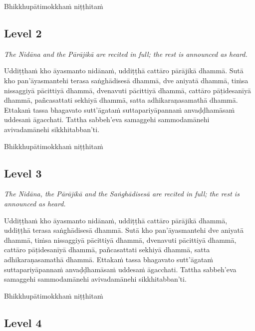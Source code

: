 \begin{outro}
	Bhikkhupātimokkhaṁ niṭṭhitaṁ
\end{outro}

{}
\subsection*{Level 2}
\label{in-brief-level2}

\textit{The Nidāna and the Pārājikā are recited in full; the rest is announced as heard.}

\smallskip

Uddiṭṭhaṁ kho āyasmanto nidānaṁ, uddiṭṭhā cattāro pārājikā dhammā. Sutā kho pan'āyasmantehi terasa saṅghādisesā dhammā, dve aniyatā dhammā, tiṁsa nissaggiyā pācittiyā dhammā, dvenavuti pācittiyā dhammā, cattāro pāṭidesanīyā dhammā, pañcasattati sekhiyā dhammā, satta adhikaraṇasamathā dhammā. Ettakaṁ tassa bhagavato sutt'āgataṁ suttapariyāpannaṁ anvaḍḍhamāsaṁ uddesaṁ āgacchati. Tattha sabbeh'eva samaggehi sammodamānehi avivadamānehi sikkhitabban'ti.

\begin{outro}
	Bhikkhupātimokkhaṁ niṭṭhitaṁ
\end{outro}

{}
\subsection*{Level 3}
\label{in-brief-level3}

\textit{The Nidāna, the Pārājikā and the Saṅghādisesā are recited in full; the rest is announced as heard.}

\smallskip

Uddiṭṭhaṁ kho āyasmanto nidānaṁ, uddiṭṭhā cattāro pārājikā dhammā, uddiṭṭhā terasa saṅghādisesā dhammā. Sutā kho pan'āyasmantehi dve aniyatā dhammā, tiṁsa nissaggiyā pācittiyā dhammā, dvenavuti pācittiyā dhammā, cattāro pāṭidesanīyā dhammā, pañcasattati sekhiyā dhammā, satta adhikaraṇasamathā dhammā. Ettakaṁ tassa bhagavato sutt'āgataṁ suttapariyāpannaṁ anvaḍḍhamāsaṁ uddesaṁ āgacchati. Tattha sabbeh'eva samaggehi sammodamānehi avivadamānehi sikkhitabban'ti.

\begin{outro}
	Bhikkhupātimokkhaṁ niṭṭhitaṁ
\end{outro}

{}
\subsection*{Level 4}
\label{in-brief-level4}

